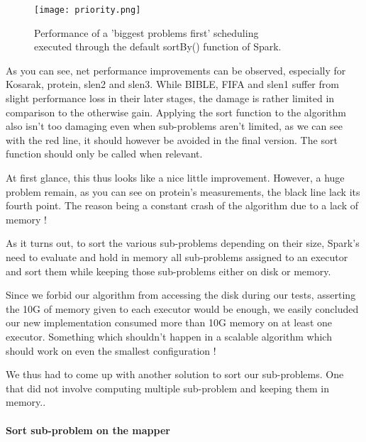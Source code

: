 \documentclass{eplmastersthesis}
\begin{document}
\begin{figure}[h]
  \centering
  \texttt{[image: priority.png]}
  \caption[Naive priority scheduling]{
  		Performance of a 'biggest problems first' scheduling \\
  		executed through the default sortBy() function of Spark.
  	\endtabular
  }
  \label{fig:priority_scheduling_performance_comparison}
\end{figure}

As you can see, net performance improvements can be observed, especially for Kosarak, protein, slen2 and slen3. While BIBLE, FIFA and slen1 suffer from slight performance loss in their later stages, the damage is rather limited in comparison to the otherwise gain. Applying the sort function to the algorithm also isn't too damaging  even when sub-problems aren't limited, as we can see with the red line, it should however be avoided in the final version. The sort function should only be called when relevant.\newline

At first glance, this thus looks like a nice little improvement. However, a huge problem remain, as you can see on protein's measurements, the black line lack its fourth point. The reason being a constant crash of the algorithm due to a lack of memory ! \newline

As it turns out, to sort the various sub-problems depending on their size, Spark's need to evaluate and hold in memory all sub-problems assigned to an executor and sort them while keeping those sub-problems either on disk or memory. \newline

Since we forbid our algorithm from accessing the disk during our tests, asserting the 10G of memory given to each executor would be enough, we easily concluded our new implementation consumed more than 10G memory on at least one executor. Something which shouldn't happen in a scalable algorithm which should work on even the smallest configuration ! \newline

We thus had to come up with another solution to sort our sub-problems. One that did not involve computing multiple sub-problem and keeping them in memory..

\paragraph{Sort sub-problem on the mapper}
\end{document}

